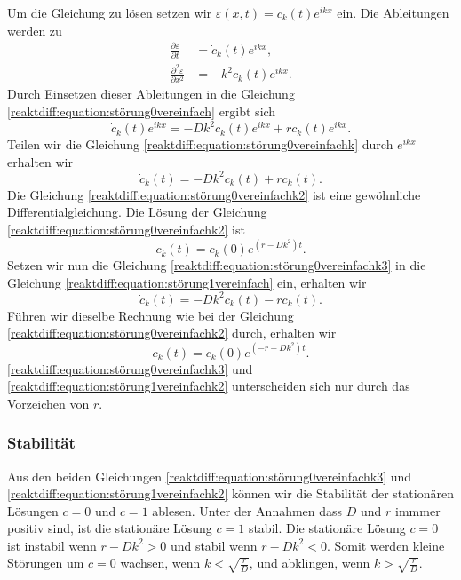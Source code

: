 Um die Gleichung zu lösen setzen wir \(\varepsilon(x,t) = c_k(t) e^{ikx}\) ein.
Die Ableitungen werden zu
\begin{align*}
\frac{\partial \varepsilon}{\partial t} &= \dot{c}_k(t) e^{ikx},\\
\frac{\partial^2 \varepsilon}{\partial x^2} &= -k^2 c_k(t) e^{ikx}.
\end{align*}
Durch Einsetzen dieser Ableitungen in die Gleichung \eqref{reaktdiff:equation:störung0vereinfach} ergibt sich
\begin{equation}
\label{reaktdiff:equation:störung0vereinfachk}
\dot{c}_k(t) e^{ikx} = -D k^2 c_k(t) e^{ikx} + r c_k(t) e^{ikx}.
\end{equation}
Teilen wir die Gleichung \eqref{reaktdiff:equation:störung0vereinfachk} durch \(e^{ikx}\) erhalten wir
\begin{equation}
\label{reaktdiff:equation:störung0vereinfachk2}
\dot{c}_k(t) = -D k^2 c_k(t) + r c_k(t).
\end{equation}
Die Gleichung \eqref{reaktdiff:equation:störung0vereinfachk2} ist eine gewöhnliche Differentialgleichung.
Die Lösung der Gleichung \eqref{reaktdiff:equation:störung0vereinfachk2} ist
\begin{equation}
\label{reaktdiff:equation:störung0vereinfachk3}
c_k(t) = c_k(0) e^{(r - D k^2)t}.
\end{equation}
Setzen wir nun die Gleichung \eqref{reaktdiff:equation:störung0vereinfachk3} in die Gleichung \eqref{reaktdiff:equation:störung1vereinfach} ein, erhalten wir
\begin{equation}
\label{reaktdiff:equation:störung1vereinfachk}
\dot{c}_k(t) = -D k^2 c_k(t) - r c_k(t).
\end{equation}
Führen wir dieselbe Rechnung wie bei der 
Gleichung \eqref{reaktdiff:equation:störung0vereinfachk2} durch, erhalten wir
\begin{equation}
\label{reaktdiff:equation:störung1vereinfachk2}
c_k(t) = c_k(0) e^{(-r - D k^2)t}.
\end{equation}
\eqref{reaktdiff:equation:störung0vereinfachk3} und \eqref{reaktdiff:equation:störung1vereinfachk2} unterscheiden sich nur durch das Vorzeichen von \(r\).

\subsubsection{Stabilität}
Aus den beiden Gleichungen \eqref{reaktdiff:equation:störung0vereinfachk3} und \eqref{reaktdiff:equation:störung1vereinfachk2} können wir die Stabilität der stationären Lösungen \(c = 0\) und \(c = 1\) ablesen.
%
Unter der Annahmen dass \(D\) und \(r\) immmer positiv sind, ist die stationäre Lösung \(c = 1\) stabil.
Die stationäre Lösung \(c = 0\) ist instabil wenn \(r-Dk^2 > 0\) und stabil wenn \(r-Dk^2 < 0\).
Somit werden kleine Störungen um \(c = 0\) wachsen, wenn \(k < \!\sqrt{\frac{r}{D}}\), und abklingen, wenn \(k > \!\sqrt{\frac{r}{D}}\).

